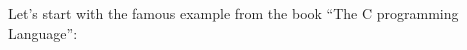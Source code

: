 ﻿\section{\HelloWorldSectionName}
\label{sec:helloworld}

{Let's start with the famous example from the book}
``The C programming Language''\cite{Kernighan:1988:CPL:576122}:






